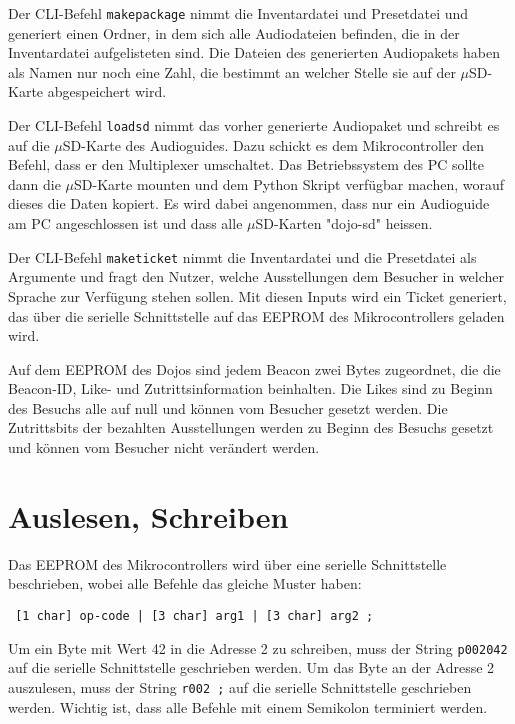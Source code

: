 Der CLI-Befehl \texttt{makepackage} nimmt die Inventardatei und Presetdatei und generiert einen Ordner, in dem sich alle Audiodateien befinden, die in der Inventardatei aufgelisteten sind.
Die Dateien des generierten Audiopakets haben als Namen nur noch eine Zahl, die bestimmt an welcher Stelle sie auf der $\mu$SD-Karte abgespeichert wird.

Der CLI-Befehl \texttt{loadsd} nimmt das vorher generierte Audiopaket und schreibt es auf die $\mu$SD-Karte des Audioguides.
Dazu schickt es dem Mikrocontroller den Befehl, dass er den Multiplexer umschaltet.
Das Betriebssystem des PC sollte dann die $\mu$SD-Karte mounten und dem Python Skript verfügbar machen, worauf dieses die Daten kopiert.
Es wird dabei angenommen, dass nur ein Audioguide am PC angeschlossen ist und dass alle $\mu$SD-Karten "dojo-sd" heissen.

Der CLI-Befehl \texttt{maketicket} nimmt die Inventardatei und die Presetdatei als Argumente und fragt den Nutzer, welche Ausstellungen dem Besucher in welcher Sprache zur Verfügung stehen sollen. 
Mit diesen Inputs wird ein Ticket generiert, das über die serielle Schnittstelle auf das EEPROM des Mikrocontrollers geladen wird.

Auf dem EEPROM des Dojos sind jedem Beacon zwei Bytes zugeordnet, die die Beacon-ID, Like- und Zutrittsinformation beinhalten.
Die Likes sind zu Beginn des Besuchs alle auf null und können vom Besucher gesetzt werden.
Die Zutrittsbits der bezahlten Ausstellungen werden zu Beginn des Besuchs gesetzt und können vom Besucher nicht verändert werden.


\section{Auslesen, Schreiben}
Das EEPROM des Mikrocontrollers wird über eine serielle Schnittstelle beschrieben, wobei alle Befehle das gleiche Muster haben:
\begin{verbatim} [1 char] op-code | [3 char] arg1 | [3 char] arg2 ; \end{verbatim}
Um ein Byte mit Wert 42 in die Adresse 2 zu schreiben, muss der String \texttt{p002042} auf die serielle Schnittstelle geschrieben werden.
Um das Byte an der Adresse 2 auszulesen, muss der String \texttt{r002   ;} auf die serielle Schnittstelle geschrieben werden.
Wichtig ist, dass alle Befehle mit einem Semikolon terminiert werden.

